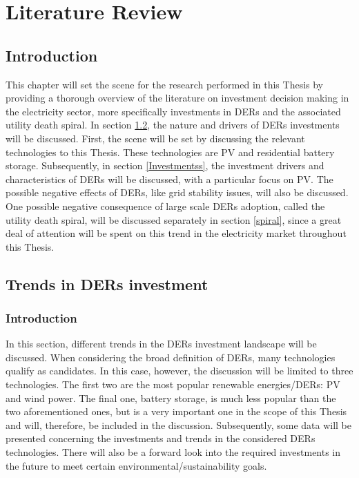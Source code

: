 \chapter{Literature Review}
\section{{Introduction}}
This chapter will set the scene for the research performed in this Thesis by providing a thorough overview of the literature on investment decision making in the electricity sector, more specifically investments in DERs and the associated utility death spiral. In section \ref{Trends}, the nature and drivers of DERs investments will be discussed. First, the scene will be set by discussing the relevant technologies to this Thesis. These technologies are PV and residential battery storage. Subsequently, in section \ref{Investmentss}, the investment drivers and characteristics of DERs will be discussed, with a particular focus on PV. The possible negative effects of DERs, like grid stability issues, will also be discussed. One possible negative consequence of large scale DERs adoption, called the utility death spiral, will be discussed separately in section \ref{spiral}, since a great deal of attention will be spent on this trend in the electricity market throughout this Thesis. 
\section{Trends in DERs investment} \label{Trends}
\subsection{Introduction}
In this section, different trends in the DERs investment landscape will be discussed. When considering the broad definition of DERs, many technologies qualify as candidates. In this case, however, the discussion will be limited to three technologies. The first two are the most popular renewable energies/DERs: PV and wind power. The final one, battery storage, is much less popular than the two aforementioned ones, but is a very important one in the scope of this Thesis and will, therefore, be included in the discussion. Subsequently, some data will be presented concerning the investments and trends in the considered DERs technologies. There will also be a forward look into the required investments in the future to meet certain environmental/sustainability goals. 
